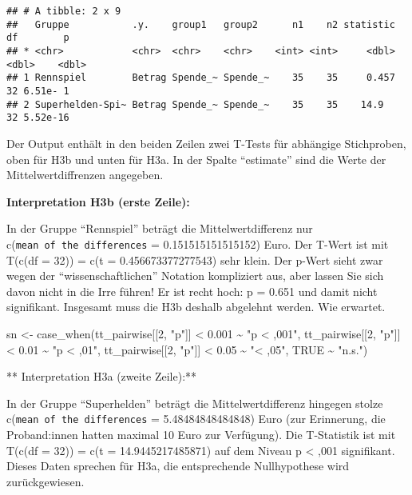 \documentclass[
]{book}
\newenvironment{Shaded}{\begin{snugshade}}{\end{snugshade}}
\newcommand{\ConstantTok}[1]{\textcolor[rgb]{0.00,0.00,0.00}{#1}}
\newcommand{\DecValTok}[1]{\textcolor[rgb]{0.00,0.00,0.81}{#1}}
\newcommand{\FloatTok}[1]{\textcolor[rgb]{0.00,0.00,0.81}{#1}}
\newcommand{\FunctionTok}[1]{\textcolor[rgb]{0.00,0.00,0.00}{#1}}
\newcommand{\NormalTok}[1]{#1}
\newcommand{\OtherTok}[1]{\textcolor[rgb]{0.56,0.35,0.01}{#1}}
\newcommand{\SpecialCharTok}[1]{\textcolor[rgb]{0.00,0.00,0.00}{#1}}
\newcommand{\StringTok}[1]{\textcolor[rgb]{0.31,0.60,0.02}{#1}}
\begin{document}
\begin{verbatim}
## # A tibble: 2 x 9
##   Gruppe           .y.    group1   group2      n1    n2 statistic    df        p
## * <chr>            <chr>  <chr>    <chr>    <int> <int>     <dbl> <dbl>    <dbl>
## 1 Rennspiel        Betrag Spende_~ Spende_~    35    35     0.457    32 6.51e- 1
## 2 Superhelden-Spi~ Betrag Spende_~ Spende_~    35    35    14.9      32 5.52e-16
\end{verbatim}

Der Output enthält in den beiden Zeilen zwei T-Tests für abhängige Stichproben, oben für H3b und unten für H3a. In der Spalte ``estimate'' sind die Werte der Mittelwertdiffrenzen angegeben.

\textbf{Interpretation H3b (erste Zeile):}

In der Gruppe ``Rennspiel'' beträgt die Mittelwertdifferenz nur c(\texttt{mean\ of\ the\ differences} = 0.151515151515152) Euro. Der T-Wert ist mit T(c(df = 32)) = c(t = 0.456673377277543) sehr klein. Der p-Wert sieht zwar wegen der ``wissenschaftlichen'' Notation kompliziert aus, aber lassen Sie sich davon nicht in die Irre führen! Er ist recht hoch: p = 0.651 und damit nicht signifikant. Insgesamt muss die H3b deshalb abgelehnt werden. Wie erwartet.

\begin{Shaded}
\begin{Highlighting}[]
\NormalTok{sn }\OtherTok{\textless{}{-}} \FunctionTok{case\_when}\NormalTok{(tt\_pairwise[[}\DecValTok{2}\NormalTok{, }\StringTok{"p"}\NormalTok{]] }\SpecialCharTok{\textless{}} \FloatTok{0.001} \SpecialCharTok{\textasciitilde{}} \StringTok{"p \textless{} ,001"}\NormalTok{,}
\NormalTok{                tt\_pairwise[[}\DecValTok{2}\NormalTok{, }\StringTok{"p"}\NormalTok{]] }\SpecialCharTok{\textless{}} \FloatTok{0.01} \SpecialCharTok{\textasciitilde{}} \StringTok{"p \textless{} ,01"}\NormalTok{,}
\NormalTok{                tt\_pairwise[[}\DecValTok{2}\NormalTok{, }\StringTok{"p"}\NormalTok{]] }\SpecialCharTok{\textless{}} \FloatTok{0.05} \SpecialCharTok{\textasciitilde{}} \StringTok{"\textless{} ,05"}\NormalTok{,}
                \ConstantTok{TRUE} \SpecialCharTok{\textasciitilde{}} \StringTok{"n.s."}\NormalTok{)}
\end{Highlighting}
\end{Shaded}

** Interpretation H3a (zweite Zeile):**

In der Gruppe ``Superhelden'' beträgt die Mittelwertdifferenz hingegen stolze c(\texttt{mean\ of\ the\ differences} = 5.48484848484848) Euro (zur Erinnerung, die Proband:innen hatten maximal 10 Euro zur Verfügung). Die T-Statistik ist mit T(c(df = 32)) = c(t = 14.9445217485871) auf dem Niveau p \textless{} ,001 signifikant. Dieses Daten sprechen für H3a, die entsprechende Nullhypothese wird zurückgewiesen.
\end{document}
